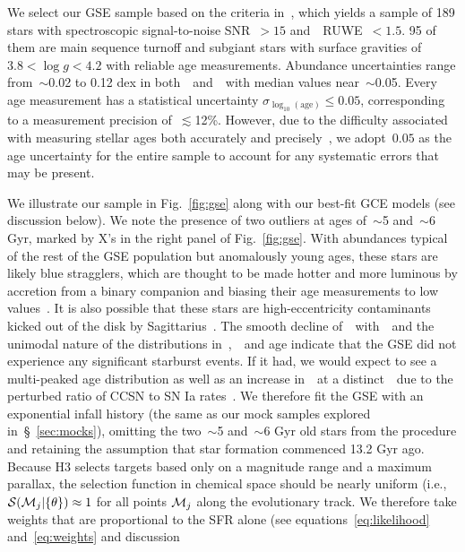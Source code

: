 \documentclass[foo.tex]{subfiles}
\begin{document}
We select our GSE sample based on the criteria in~\citet{Conroy2022}, which
yields a sample of 189 stars with spectroscopic signal-to-noise
SNR~$> 15$ and~\gaia~RUWE~$< 1.5$.
95 of them are main sequence turnoff and subgiant stars with surface gravities
of~$3.8 < \log g < 4.2$ with reliable age measurements.
Abundance uncertainties range from~$\sim$0.02 to 0.12 dex in
both~\feh~and~\afe~with median values near~$\sim$0.05.
Every age measurement has a statistical uncertainty
$\sigma_{\log_{10}(\text{age})} \leq 0.05$, corresponding to a measurement
precision of~$\lesssim$12\%.
However, due to the difficulty associated with measuring stellar ages both
accurately and precisely~\citep[e.g.,][]{Soderblom2010, Chaplin2013, Angus2019},
we adopt~$0.05$ as the age uncertainty for the entire sample to account for any
systematic errors that may be present.
\par
We illustrate our sample in Fig.~\ref{fig:gse} along with our best-fit GCE
models (see discussion below).
We note the presence of two outliers at ages of~$\sim$5 and~$\sim$6 Gyr, marked
by X's in the right panel of Fig.~\ref{fig:gse}.
With abundances typical of the rest of the GSE population but anomalously young
ages, these stars are likely blue stragglers, which are thought to be made
hotter and more luminous by accretion from a binary companion and biasing their
age measurements to low values~\citep[e.g.,][]{Bond1971, Stryker1993}.
It is also possible that these stars are high-eccentricity contaminants kicked
out of the disk by Sagittarius~\citep[e.g.,][]{Donlon2020}.
The smooth decline of~\afe~with~\feh~and the unimodal nature of the
distributions in~\feh,~\afe~and age indicate that the GSE did not experience
any significant starburst events.
If it had, we would expect to see a multi-peaked age distribution
as well as an increase in~\afe~at a distinct~\feh~due to the perturbed ratio of
CCSN to SN Ia rates~\citep{Johnson2020}.
We therefore fit the GSE with an exponential infall history (the same as our
mock samples explored in~\S~\ref{sec:mocks}), omitting the two~$\sim$5
and~$\sim$6 Gyr old stars from the procedure and retaining the assumption that
star formation commenced 13.2 Gyr ago.
Because H3 selects targets based only on a magnitude range and a maximum
parallax, the selection function in chemical space should be nearly uniform
(i.e.,~$\mathcal{S}(\mathcal{M}_j | \{\theta\}) \approx 1$ for all points
$\mathcal{M}_j$ along the evolutionary track.
We therefore take weights that are proportional to the SFR alone (see
equations~\ref{eq:likelihood} and~\ref{eq:weights} and discussion
\end{document}
